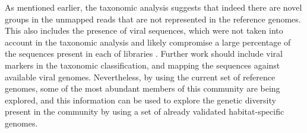 As mentioned earlier, the taxonomic analysis suggests that indeed there are novel groups in the unmapped reads that are not represented in the reference genomes. This also includes the presence of viral sequences, which were not taken into account in the taxonomic analysis and likely compromise a large percentage of the sequences present in each of libraries \cite{RodriguezBrito:2010in,Emerson:tk}. Further work should include viral markers in the taxonomic classification, and mapping the sequences against available viral genomes. Nevertheless, by using the current set of reference genomes, some of the most abundant members of this community are being explored, and this information can be used to explore the genetic diversity present in the community by using a set of already validated habitat-specific genomes.

